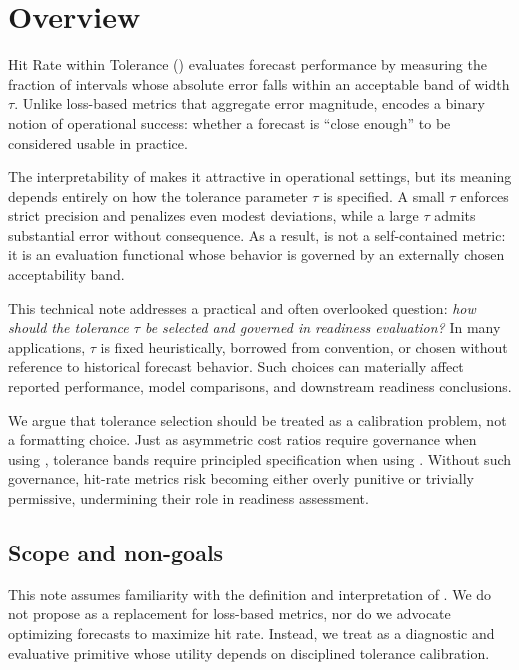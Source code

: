 \section{Overview}
\label{sec:overview}

Hit Rate within Tolerance (\HRtau{}) evaluates forecast performance by measuring
the fraction of intervals whose absolute error falls within an acceptable band
of width \(\tau\).
Unlike loss-based metrics that aggregate error magnitude, \HRtau{} encodes a
binary notion of operational success: whether a forecast is ``close enough''
to be considered usable in practice.

The interpretability of \HRtau{} makes it attractive in operational settings,
but its meaning depends entirely on how the tolerance parameter \(\tau\) is
specified.
A small \(\tau\) enforces strict precision and penalizes even modest deviations,
while a large \(\tau\) admits substantial error without consequence.
As a result, \HRtau{} is not a self-contained metric: it is an evaluation
functional whose behavior is governed by an externally chosen acceptability
band.

This technical note addresses a practical and often overlooked question:
\emph{how should the tolerance \(\tau\) be selected and governed in readiness
evaluation?}
In many applications, \(\tau\) is fixed heuristically, borrowed from convention,
or chosen without reference to historical forecast behavior.
Such choices can materially affect reported performance, model comparisons, and
downstream readiness conclusions.

We argue that tolerance selection should be treated as a calibration problem,
not a formatting choice.
Just as asymmetric cost ratios require governance when using \CWSL{}, tolerance
bands require principled specification when using \HRtau{}.
Without such governance, hit-rate metrics risk becoming either overly punitive
or trivially permissive, undermining their role in readiness assessment.

\subsection{Scope and non-goals}
\label{subsec:scope}

This note assumes familiarity with the definition and interpretation of
\HRtau{}.
We do not propose \HRtau{} as a replacement for loss-based metrics, nor do we
advocate optimizing forecasts to maximize hit rate.
Instead, we treat \HRtau{} as a diagnostic and evaluative primitive whose utility
depends on disciplined tolerance calibration.

